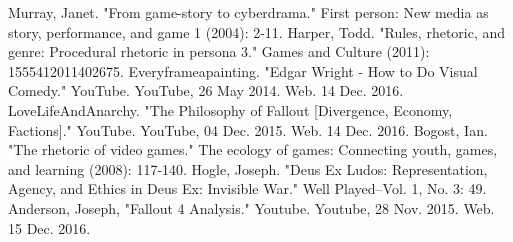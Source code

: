 \documentclass[12pt, conference]{IEEEtran}
\begin{document}





%
%
%
\begin{thebibliography}{4}
Murray, Janet. "From game-story to cyberdrama." First person: New media as story, performance, and game 1 (2004): 2-11.
Harper, Todd. "Rules, rhetoric, and genre: Procedural rhetoric in persona 3." Games and Culture (2011): 1555412011402675.
Everyframeapainting. "Edgar Wright - How to Do Visual Comedy." YouTube. YouTube, 26 May 2014. Web. 14 Dec. 2016.
LoveLifeAndAnarchy. "The Philosophy of Fallout [Divergence, Economy, Factions]." YouTube. YouTube, 04 Dec. 2015. Web. 14 Dec. 2016.
Bogost, Ian. "The rhetoric of video games." The ecology of games: Connecting youth, games, and learning (2008): 117-140.
Hogle, Joseph. "Deus Ex Ludos: Representation, Agency, and Ethics in Deus Ex: Invisible War." Well Played--Vol. 1, No. 3: 49.
Anderson, Joseph, "Fallout 4 Analysis." Youtube. Youtube, 28 Nov. 2015. Web. 15 Dec. 2016.

\end{thebibliography}

\end{document}
